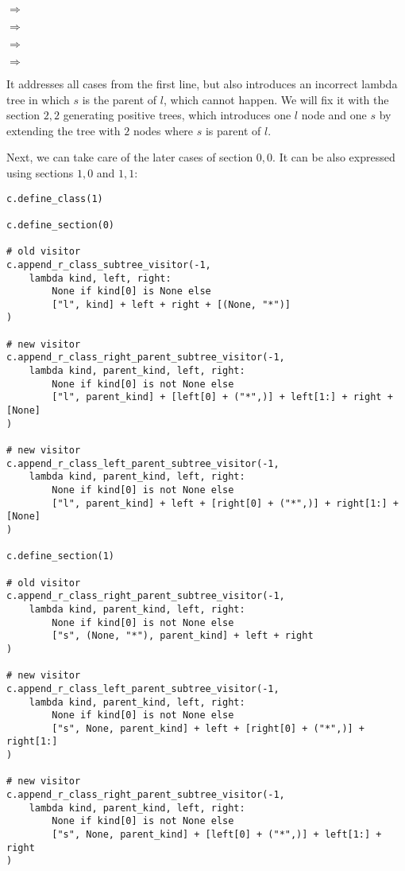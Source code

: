 \documentclass[final]{article}
\theoremstyle{definition}
\theoremstyle{remark}
\newcommand{\includeinlinesvg}[2]{\begin{minipage}{#1\textwidth}\end{minipage}}
\begin{document}
\includeinlinesvg{.24}{lambda__trees_100__0_base}\(\Rightarrow\)\includeinlinesvg{.24}{lambda__trees_100__0}%
\includeinlinesvg{.24}{lambda__trees_100__1_base}\(\Rightarrow\)\includeinlinesvg{.24}{lambda__trees_100__1}%

\includeinlinesvg{.24}{lambda__trees_100__2_base}\(\Rightarrow\)\includeinlinesvg{.24}{lambda__trees_100__2}%
\includeinlinesvg{.24}{lambda__trees_100__3_base}\(\Rightarrow\)\includeinlinesvg{.24}{lambda__trees_100__3}%

It addresses all cases from the first line, but also introduces an incorrect lambda tree in which \(s\) is the parent of \(l\), which cannot happen. We will fix it with the section \(2,2\) generating positive trees, which introduces one \(l\) node and one \(s\) by extending the tree with \(2\) nodes where \(s\) is parent of \(l\).

Next, we can take care of the later cases of section \(0, 0\). It can be also expressed using sections \(1, 0\) and \(1, 1\):

\begin{lstlisting}
c.define_class(1)

c.define_section(0)

# old visitor
c.append_r_class_subtree_visitor(-1,
    lambda kind, left, right:
        None if kind[0] is None else
        ["l", kind] + left + right + [(None, "*")]
)

# new visitor
c.append_r_class_right_parent_subtree_visitor(-1,
    lambda kind, parent_kind, left, right:
        None if kind[0] is not None else
        ["l", parent_kind] + [left[0] + ("*",)] + left[1:] + right + [None]
)

# new visitor
c.append_r_class_left_parent_subtree_visitor(-1,
    lambda kind, parent_kind, left, right:
        None if kind[0] is not None else
        ["l", parent_kind] + left + [right[0] + ("*",)] + right[1:] + [None]
)

c.define_section(1)

# old visitor
c.append_r_class_right_parent_subtree_visitor(-1,
    lambda kind, parent_kind, left, right:
        None if kind[0] is not None else
        ["s", (None, "*"), parent_kind] + left + right
)

# new visitor
c.append_r_class_left_parent_subtree_visitor(-1,
    lambda kind, parent_kind, left, right:
        None if kind[0] is not None else
        ["s", None, parent_kind] + left + [right[0] + ("*",)] + right[1:]
)

# new visitor
c.append_r_class_right_parent_subtree_visitor(-1,
    lambda kind, parent_kind, left, right:
        None if kind[0] is not None else
        ["s", None, parent_kind] + [left[0] + ("*",)] + left[1:] + right
)
\end{lstlisting}
\end{document}

